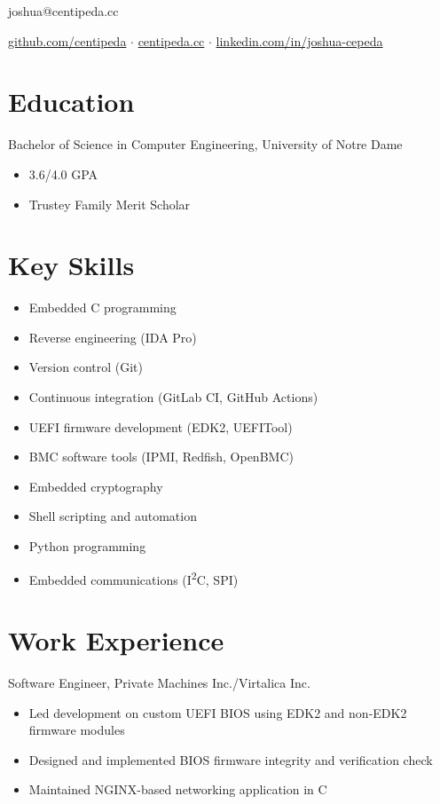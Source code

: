 \documentclass[11pt]{article}
\newcommand{\listing}[2]{#1 \hfill \strong{#2}}
\newcommand{\details}[1]{
    \vspace{-10pt}
    \begin{itemize}
        \setlength\itemsep{-4pt}
        #1
    \end{itemize}
}
\newcommand{\sect}[1]{\vspace{-15pt}\section*{#1}\vspace{-10pt}}
\begin{document}
    \begin{center}
        {\Huge {}}

        \vspace{5pt}

        joshua@centipeda.cc

        \href{https://github.com/centipeda}{github.com/centipeda} 
        $\cdot$ \href{https://centipeda.cc}{centipeda.cc} 
        $\cdot$ \href{https://linkedin.com/in/joshua-cepeda}{linkedin.com/in/joshua-cepeda}
    \end{center}
    \vspace{-10pt}
    \hrulefill
    \vspace{-15pt}


    \vspace{20pt}
    \sect{Education}

    \listing{Bachelor of Science in Computer Engineering, University of Notre Dame}{2018 - 2022}
    \details{
        \item 3.6/4.0 GPA
        \item Trustey Family Merit Scholar
    }


    \sect{Key Skills}
    \vspace{-10pt}
    \begin{multicols}{2}
        \begin{itemize}
            \setlength\itemsep{-4pt}
            \item Embedded C programming
            \item Reverse engineering (IDA Pro)
            \item Version control (Git)
            \item Continuous integration (GitLab CI, GitHub Actions)
            \item UEFI firmware development (EDK2, UEFITool)
            \item BMC software tools (IPMI, Redfish, OpenBMC)
            \item Embedded cryptography
            \item Shell scripting and automation
            \item Python programming
            \item Embedded communications (I\textsuperscript{2}C, SPI)
        \end{itemize}
    \end{multicols}

    \sect{Work Experience}
    \listing{Software Engineer, Private Machines Inc./Virtalica Inc.}{2021 - Present}
    \details{
        \item Led development on custom UEFI BIOS using EDK2 and non-EDK2 firmware modules
        \item Designed and implemented BIOS firmware integrity and verification check
        \item Maintained NGINX-based networking application in C
    }
\end{document}
